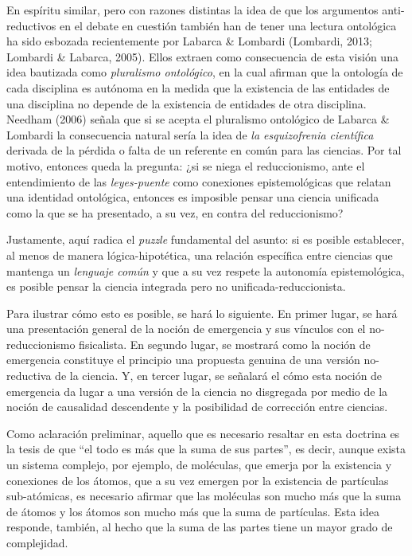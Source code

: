 \documentclass[]{book}
\begin{document}
En espíritu similar, pero con razones distintas la idea de que los
argumentos anti-reductivos en el debate en cuestión también han de tener
una lectura ontológica ha sido esbozada recientemente por Labarca \&
Lombardi (Lombardi, 2013; Lombardi \& Labarca, 2005). Ellos extraen como
consecuencia de esta visión una idea bautizada como \emph{pluralismo
ontológico}, en la cual afirman que la ontología de cada disciplina es
autónoma en la medida que la existencia de las entidades de una
disciplina no depende de la existencia de entidades de otra disciplina.
Needham (2006) señala que si se acepta el pluralismo ontológico de
Labarca \& Lombardi la consecuencia natural sería la idea de \emph{la
esquizofrenia científica} derivada de la pérdida o falta de un referente
en común para las ciencias. Por tal motivo, entonces queda la pregunta:
¿si se niega el reduccionismo, ante el entendimiento de las
\emph{leyes-puente} como conexiones epistemológicas que relatan una
identidad ontológica, entonces es imposible pensar una ciencia unificada
como la que se ha presentado, a su vez, en contra del reduccionismo?

Justamente, aquí radica el \emph{puzzle} fundamental del asunto: si es
posible establecer, al menos de manera lógica-hipotética, una relación
específica entre ciencias que mantenga un \emph{lenguaje común} y que a
su vez respete la autonomía epistemológica, es posible pensar la ciencia
integrada pero no unificada-reduccionista.

Para ilustrar cómo esto es posible, se hará lo siguiente. En primer
lugar, se hará una presentación general de la noción de emergencia y sus
vínculos con el no-reduccionismo fisicalista. En segundo lugar, se
mostrará como la noción de emergencia constituye el principio una
propuesta genuina de una versión no-reductiva de la ciencia. Y, en
tercer lugar, se señalará el cómo esta noción de emergencia da lugar a
una versión de la ciencia no disgregada por medio de la noción de
causalidad descendente y la posibilidad de corrección entre ciencias.

Como aclaración preliminar, aquello que es necesario resaltar en esta
doctrina es la tesis de que ``el todo es más que la suma de sus
partes'', es decir, aunque exista un sistema complejo, por ejemplo, de
moléculas, que emerja por la existencia y conexiones de los átomos, que
a su vez emergen por la existencia de partículas sub-atómicas, es
necesario afirmar que las moléculas son mucho más que la suma de átomos
y los átomos son mucho más que la suma de partículas. Esta idea
responde, también, al hecho que la suma de las partes tiene un mayor
grado de complejidad.
\end{document}
